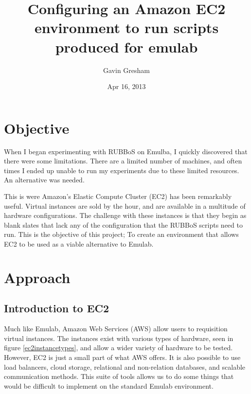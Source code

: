 \documentclass{article}
\begin{document}
\title{Configuring an Amazon EC2 environment to run scripts produced for emulab}
\author{Gavin Gresham}
\date{Apr 16, 2013}
\maketitle

\tableofcontents
\pagebreak

\section{Objective}
When I began experimenting with RUBBoS on Emulba, I quickly discovered that there were some limitations. There are a limited number of machines, and often times I ended up unable to run my experiments due to these limited resources. An alternative was needed.

This is were Amazon's Elastic Compute Cluster (EC2) has been remarkably useful. Virtual instances are sold by the hour, and are available in a multitude of hardware configurations. The challenge with these instances is that they begin as blank slates that lack any of the configuration that the RUBBoS scripts need to run. This is the objective of this project; To create an environment that allows EC2 to be used as a viable alternative to Emulab.
\section{Approach}
\subsection{Introduction to EC2}
Much like Emulab, Amazon Web Services (AWS) allow users to requisition virtual instances. The instances exist with various types of hardware, seen in figure \ref{ec2instancetypes}, and allow a wider variety of hardware to be tested. However, EC2 is just a small part of what AWS offers. It is also possible to use load balancers, cloud storage, relational and non-relation databases, and scalable communication methods. This suite of tools allows us to do some things that would be difficult to implement on the standard Emulab environment.
\end{document}
